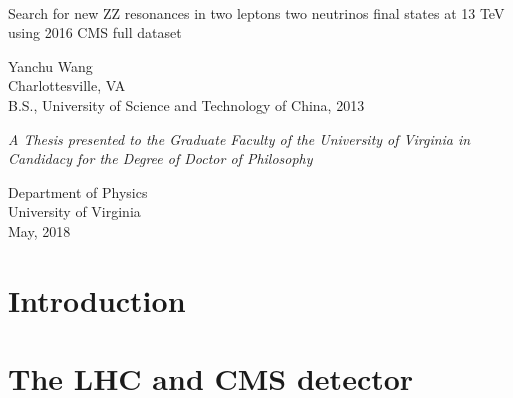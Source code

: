 \documentclass[11pt,a4paper,oldfontcommands]{memoir}
\begin{document}
%
%
\thispagestyle{empty}

{%
\centering
\Large

~\vspace{\fill}

{\huge 
Search for new ZZ resonances in two leptons two neutrinos final states at 13 TeV using 2016 CMS full dataset
}

\vspace{2.5cm}

{\LARGE
Yanchu Wang\\
}
Charlottesville, VA\\[1em]

B.S., University of Science and Technology of China, 2013

\vspace{3.5cm}
\vspace{\fill}
\textrm{\textit{A Thesis presented to the Graduate Faculty of the University of Virginia in Candidacy for the Degree of Doctor of Philosophy}}

\vspace{3.5cm}


\vspace{\fill}
Department of Physics\\[1em]
University of Virginia\\
May, 2018

}%

\cleardoublepage

\tableofcontents*

\clearpage


\chapter{Introduction}

\chapter{The LHC and CMS detector}

\end{document}
